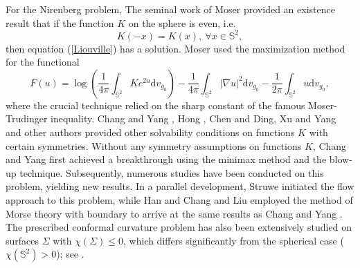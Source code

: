 \documentclass[a4paper, 12pt]{article}
\begin{document}
	For the Nirenberg problem, The seminal work of Moser \cite{MR339258} provided an existence result that if the function $K$ on the sphere is even, i.e.
	\begin{equation*}
		K(-x) = K(x),\ \forall x\in \mathbb{S}^2,
	\end{equation*}
	then equation (\ref{Liouville}) has a solution. Moser used the maximization method for the functional
	\begin{equation*}
		F\left( u \right) = \log \left( {\frac{1}{{4\pi }}\int_{{\mathbb{S}^2}} {K{e^{2u}}} {\text{d}}{v_{g_0}}} \right) - \frac{1}{{4\pi }}\int_{{\mathbb{S}^2}} {{{\left| {\nabla u} \right|}^2}} {\text{d}}{v_{g_0}} - \frac{1}{{2\pi }}\int_{{\mathbb{S}^2}} u {\text{d}}{v_{g_0}},
	\end{equation*}
	where the crucial technique relied on the sharp constant of the famous Moser-Trudinger inequality. Chang and Yang \cite{chang1988conformal}, Hong \cite{MR845999}, Chen and Ding\cite{MR896027}, Xu and Yang \cite{MR1087058} and other authors provided other solvability conditions on functions $K$ with certain symmetries. Without any symmetry assumptions on functions $K$, Chang and Yang \cite{changMR0908146} first achieved a breakthrough using the minimax method and the blow-up technique. Subsequently, numerous studies have been conducted on this problem, yielding new results. In a parallel development, Struwe \cite{MR2137948} initiated the flow approach to this problem, while Han \cite{MR1084455} and Chang and Liu \cite{chang1993nirenberg} employed the method of Morse theory with boundary to arrive at the same results as Chang and Yang \cite{changMR0908146}. The prescribed conformal curvature problem has also been extensively studied on surfaces $\Sigma$ with $\chi(\Sigma) \le 0$, which differs significantly from the spherical case ($\chi(\mathbb{S}^2) > 0$); see \cite{MR295261,MR1937411,MR375153,kazdan1974curvature,MR2137948}.
	
\end{document}

